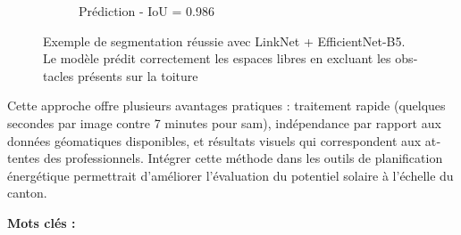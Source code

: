 \begin{otherlanguage}{french}
\begin{figure}[htbp]
\begin{subfigure}{0.32\textwidth}
        \caption{Prédiction - IoU = 0.986}
    \end{subfigure}
    \caption{Exemple de segmentation réussie avec LinkNet + EfficientNet-B5. Le modèle prédit correctement les espaces libres en excluant les obstacles présents sur la toiture}
    \label{fig:resume_exemple_segmentation_reussie}
\end{figure}

Cette approche offre plusieurs avantages pratiques : traitement rapide (quelques secondes par image contre 7 minutes pour \acrshort{sam}), indépendance par rapport aux données géomatiques disponibles, et résultats visuels qui correspondent aux attentes des professionnels. Intégrer cette méthode dans les outils de planification énergétique permettrait d'améliorer l'évaluation du potentiel solaire à l'échelle du canton.


\vskip0.5cm
\textbf{Mots clés :}
\Keywordsfr
\end{otherlanguage}

